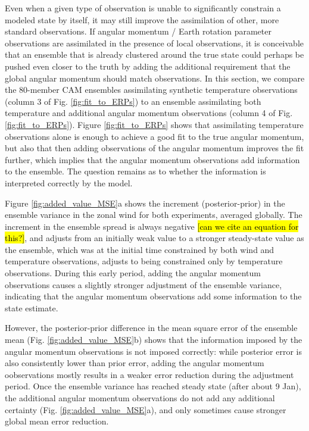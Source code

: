 Even when a given type of observation is unable to significantly constrain a modeled state by itself, it may still improve the assimilation of other, more standard observations.  
If angular momentum / Earth rotation parameter observations are assimilated in the presence of local observations, it is conceivable that an ensemble that is already clustered around the true state could perhaps be pushed even closer to the truth by adding the additional requirement that the global angular momentum should match observations. 
In this section, we compare the 80-member CAM ensembles assimilating synthetic temperature observations (column 3 of Fig. \ref{fig:fit_to_ERPs}) to an ensemble assimilating both temperature and additional angular momentum observations (column 4 of Fig. \ref{fig:fit_to_ERPs}).
Figure \ref{fig:fit_to_ERPs} shows that assimilating 
temperature observations alone is enough to achieve a good fit to the true angular momentum, but also that 
then adding observations of the angular momentum improves the fit further, which implies that  
the angular momentum observations add information to the ensemble. 
The question remains as to whether the information is interpreted correctly by the model.

Figure \ref{fig:added_value_MSE}a shows the increment (posterior-prior) in the ensemble variance in the zonal wind for both experiments, averaged globally. 
The increment in the ensemble spread is always negative \hl{[can we cite an equation for this?]}, and adjusts from an initially weak value to a stronger steady-state value as the ensemble, which was at the initial time constrained by both wind and temperature observations, adjusts to being constrained only by temperature observations. 
During this early period, adding the angular momentum observations causes a slightly stronger adjustment of the ensemble variance, indicating that the angular momentum observations add some information to the state estimate. 

However, the posterior-prior difference in the mean square error of the ensemble mean (Fig. \ref{fig:added_value_MSE}b) shows that the information imposed by the angular momentum observations is not imposed correctly: while posterior error is also consistently lower than prior error, adding the angular momentum oobservations mostly results in a weaker error reduction during the adjustment period. 
Once the ensemble variance has reached steady state (after about 9 Jan), the additional angular momentum observations do not add any additional certainty (Fig. \ref{fig:added_value_MSE}a), and only sometimes cause stronger global mean error reduction. 

